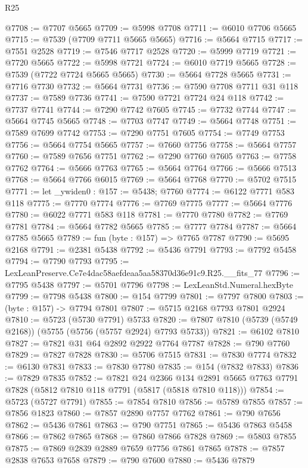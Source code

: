 \begin{lexlean}{R25}
\begin{coremodule}
@7708 := @7707 @5665
@7709 := @5998 @7708
@7711 := @6010 @7706 @5665
@7715 := @7539 (@7709 @7711 @5665 @5665)
@7716 := @5664 @7715
@7717 := @7551 @2528
@7719 := @7546 @7717 @2528
@7720 := @5999 @7719
@7721 := @7720 @5665
@7722 := @5998 @7721
@7724 := @6010 @7719 @5665
@7728 := @7539 (@7722 @7724 @5665 @5665)
@7730 := @5664 @7728 @5665
@7731 := @7716 @7730
@7732 := @5664 @7731
@7736 := @7590 @7708 @7711 @31 @118
@7737 := @7589 @7736
@7741 := @7590 @7721 @7724 @24 @118
@7742 := @7737 @7741
@7744 := @7290 @7742 @7605
@7745 := @7732 @7744
@7747 := @5664 @7745 @5665
@7748 := @7703 @7747
@7749 := @5664 @7748
@7751 := @7589 @7699 @7742
@7753 := @7290 @7751 @7605
@7754 := @7749 @7753
@7756 := @5664 @7754 @5665
@7757 := @7660 @7756
@7758 := @5664 @7757
@7760 := @7589 @7656 @7751
@7762 := @7290 @7760 @7605
@7763 := @7758 @7762
@7764 := @5666 @7763
@7765 := @5664 @7764
@7766 := @5666 @7513
@7768 := @5664 @7766 @6015
@7769 := @5664 @7768
@7770 := @5702 @7515
@7771 := let _ywiden0 : @157 := @5438; @7760
@7774 := @6122 @7771 @583 @118
@7775 := @7770 @7774
@7776 := @7769 @7775
@7777 := @5664 @7776
@7780 := @6022 @7771 @583 @118
@7781 := @7770 @7780
@7782 := @7769 @7781
@7784 := @5664 @7782 @5665
@7785 := @7777 @7784
@7787 := @5664 @7785 @5665
@7789 := fun (byte : @157) => @7765 @7787
@7790 := @5695 @2168
@7791 := @2381 @5438
@7792 := @5436 @7791
@7793 := @7792 @5458
@7794 := @7790 @7793
@7795 := LexLeanPreserve.Ce7e4dac58aefdeaa5aa58370d36e91c9.R25.__fits_77
@7796 := @7795 @5438
@7797 := @5701 @7796
@7798 := LexLeanStd.Numeral.hexByte
@7799 := @7798 @5438
@7800 := @154 @7799
@7801 := @7797 @7800
@7803 := (byte : @157) -> @7794 @7801
@7807 := @5715 @2168 @7793 @7801 @2924
@7810 := @5723 (@5730 @7791) @5733
@7820 := @7807 @7810 (@5739 (@5749 @2168)) (@5755 (@5756 (@5757 @2924) @7793 @5733))
@7821 := @6102 @7810
@7827 := @7821 @31 @64 @2892 @2922 @7764 @7787
@7828 := @790 @7760
@7829 := @7827 @7828
@7830 := @5706 @7515
@7831 := @7830 @7774
@7832 := @6130 @7831
@7833 := @7830 @7780
@7835 := @154 (@7832 @7833)
@7836 := @7829 @7835
@7852 := @7821
    @24
    @2366
    @134
    @2891
    @5665
    @7763
    @7791
    @7828
    (@5812 @7810 @118 @7791 (@5817 (@5818 @7810 @118)))
@7854 := @5723 (@5727 @7791)
@7855 := @7854 @7810
@7856 := @5789 @7855
@7857 := @7856 @1823
@7860 := @7857 @2890 @7757 @7762
@7861 := @790 @7656
@7862 := @5436 @7861
@7863 := @790 @7751
@7865 := @5436 @7863 @5458
@7866 := @7862 @7865
@7868 := @7860 @7866 @7828
@7869 := @5803 @7855
@7875 := @7869 @2839 @2889 @7659 @7756 @7861 @7865
@7878 := @7857 @2838 @7653 @7658
@7879 := @790 @7600
@7880 := @5436 @7879

\end{coremodule}
\end{lexlean}
